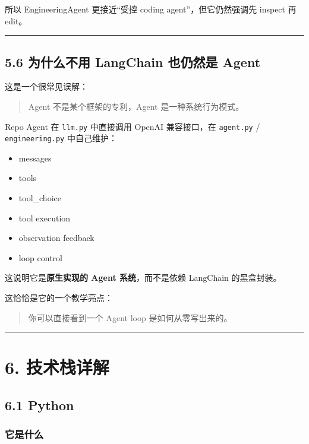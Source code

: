\documentclass[UTF8,12pt,openany]{ctexbook}
\begin{document}
所以 EngineeringAgent 更接近“受控 coding agent”，但它仍然强调先 inspect 再 edit。\par

\hrule

\subsection{5.6 为什么不用 LangChain 也仍然是 Agent}

这是一个很常见误解：\par

\begin{quote}
Agent 不是某个框架的专利，Agent 是一种系统行为模式。
\end{quote}

Repo Agent 在 \texttt{llm.py} 中直接调用 OpenAI 兼容接口，在 \texttt{agent.py} / \texttt{engineering.py} 中自己维护：\par

\begin{itemize}
\item messages
\item tools
\item tool\_choice
\item tool execution
\item observation feedback
\item loop control
\end{itemize}

这说明它是\textbf{原生实现的 Agent 系统}，而不是依赖 LangChain 的黑盒封装。\par

这恰恰是它的一个教学亮点：\par

\begin{quote}
你可以直接看到一个 Agent loop 是如何从零写出来的。
\end{quote}

\hrule

\section{6. 技术栈详解}

\subsection{6.1 Python}

\subsubsection{它是什么}
\end{document}
